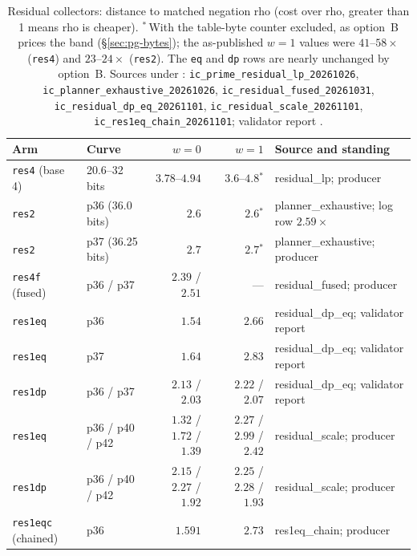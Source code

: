 \begin{table}[t]
\centering\small
\begin{tabularx}{\linewidth}{@{}llrrX@{}}
\toprule
Arm & Curve & $w=0$ & $w=1$ & Source and standing \\
\midrule
\texttt{res4} (base 4) & 20.6--32 bits & $3.78$--$4.94$ & $3.6$--$4.8$$^\ast$ & residual\_lp; producer \\
\texttt{res2} & p36 (36.0 bits) & $2.6$ & $2.6$$^\ast$ & planner\_exhaustive; log row $2.59\times$ \\
\texttt{res2} & p37 (36.25 bits) & $2.7$ & $2.7$$^\ast$ & planner\_exhaustive; producer \\
\texttt{res4f} (fused) & p36 / p37 & $2.39$ / $2.51$ & --- & residual\_fused; producer \\
\addlinespace
\texttt{res1eq} & p36 & $1.54$ & $2.66$ & residual\_dp\_eq; validator report \\
\texttt{res1eq} & p37 & $1.64$ & $2.83$ & residual\_dp\_eq; validator report \\
\texttt{res1dp} & p36 / p37 & $2.13$ / $2.03$ & $2.22$ / $2.07$ & residual\_dp\_eq; validator report \\
\addlinespace
\texttt{res1eq} & p36 / p40 / p42 & $1.32$ / $1.72$ / $1.39$ & $2.27$ / $2.99$ / $2.42$ & residual\_scale; producer \\
\texttt{res1dp} & p36 / p40 / p42 & $2.15$ / $2.27$ / $1.92$ & $2.25$ / $2.28$ / $1.93$ & residual\_scale; producer \\
\texttt{res1eqc} (chained) & p36 & $1.591$ & $2.73$ & res1eq\_chain; producer \\
\bottomrule
\end{tabularx}
\caption[]{Residual collectors: distance to matched negation rho
(cost over rho, greater than 1 means rho is cheaper). $^\ast$\,With the
table-byte counter excluded, as option~B prices the band
(\S\ref{sec:pg-bytes}); the as-published $w=1$ values were $41$--$58\times$
(\texttt{res4}) and $23$--$24\times$ (\texttt{res2}). The \texttt{eq} and
\texttt{dp} rows are nearly unchanged by option~B. Sources under
: \texttt{ic\_prime\_residual\_lp\_20261026},
\texttt{ic\_planner\_exhaustive\_20261026},
\texttt{ic\_residual\_fused\_20261031},
\texttt{ic\_residual\_dp\_eq\_20261101}, \texttt{ic\_residual\_scale\_20261101},
\texttt{ic\_res1eq\_chain\_20261101}; validator report
.}
\label{tab:pg-residual}
\end{table}

